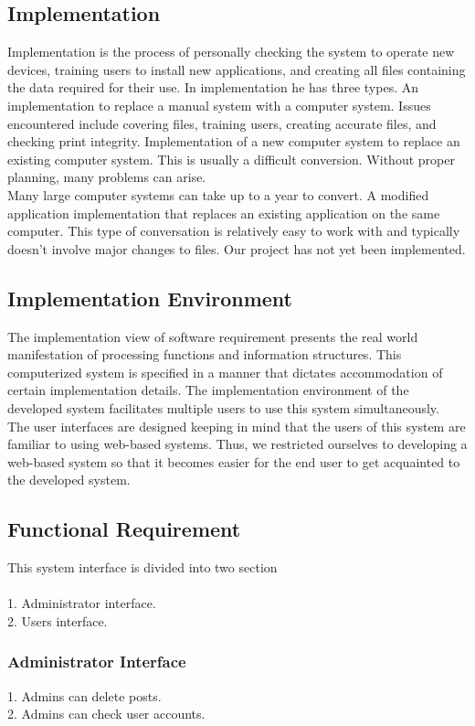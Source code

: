 \documentclass{article}
\begin{document}
\subsection{Implementation}
Implementation is the process of personally checking the system to operate new devices, training users to install new applications, and creating all files containing the data required for their use. In implementation he has three types. An implementation to replace a manual system with a computer system. Issues encountered include covering files, training users, creating accurate files, and checking print integrity. Implementation of a new computer system to replace an existing computer system. This is usually a difficult conversion. Without proper planning, many problems can arise.\\ Many large computer systems can take up to a year to convert. A modified application implementation that replaces an existing application on the same computer. This type of conversation is relatively easy to work with and typically doesn't involve major changes to files. Our project has not yet been implemented.

\subsection{Implementation Environment}
The implementation view of software requirement presents the real world manifestation of processing functions and information structures. This computerized system is specified in a manner that dictates accommodation of certain implementation details. 
The implementation environment of the developed system facilitates multiple users to use this system simultaneously.\\ The user interfaces are designed keeping in mind that the users of this system are familiar to using web-based systems. Thus, we restricted ourselves to developing a web-based system so that it becomes easier for the end user to get acquainted to the developed system.

\subsection{Functional Requirement}
This system interface is divided into two section\\\\ 
1.	Administrator interface.  \\
2.	Users interface. \\
\subsubsection{Administrator Interface}
1. Admins can delete posts.\\
2. Admins can check user accounts.  
\end{document}
